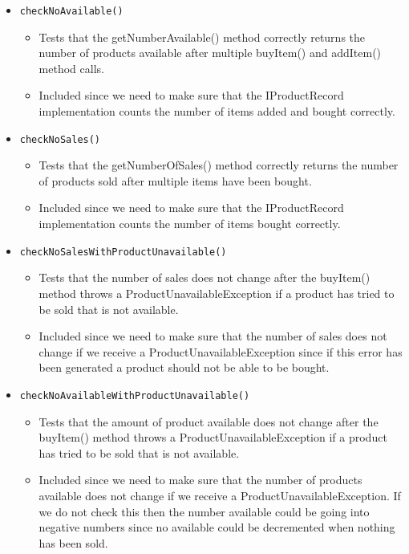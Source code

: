 \documentclass{article}
\begin{document}
\begin{itemize}
\item \verb+checkNoAvailable()+
\begin{itemize}
\item Tests that the getNumberAvailable() method correctly returns the number of products available after multiple buyItem() and addItem() method calls.
\item Included since we need to make sure that the IProductRecord implementation counts the number of items added and bought correctly.
\end{itemize}

\item \verb+checkNoSales()+
\begin{itemize}
\item Tests that the getNumberOfSales() method correctly returns the number of products sold after multiple items have been bought.
\item Included since we need to make sure that the IProductRecord implementation counts the number of items bought correctly.
\end{itemize}

\item \verb+checkNoSalesWithProductUnavailable()+
\begin{itemize}
\item Tests that the number of sales does not change after the buyItem() method throws a ProductUnavailableException if a product has tried to be sold that is not available.
\item Included since we need to make sure that the number of sales does not change if we receive a ProductUnavailableException since if this error has been generated a product should not be able to be bought.
\end{itemize}

\item \verb+checkNoAvailableWithProductUnavailable()+
\begin{itemize}
\item Tests that the amount of product available does not change after the buyItem() method throws a ProductUnavailableException if a product has tried to be sold that is not available.
\item Included since we need to make sure that the number of products available does not change if we receive a ProductUnavailableException. If we do not check this then the number available could be going into negative numbers since no available could be decremented when nothing has been sold.
\end{itemize}


\end{itemize}
\end{document}
